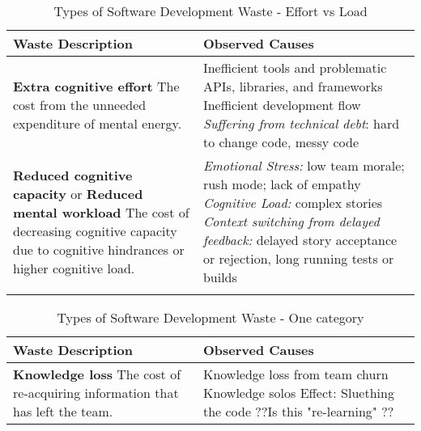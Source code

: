 \begin{table*}[htbp]
\renewcommand{\arraystretch}{1.3}
\centering
\caption{Types of Software Development Waste - Effort vs Load}
\label{Waste}
\begin{tabular}{|p{2.5in}|p{3.6in}|} %
\hline
\textbf{Waste} \newline Description  & Observed Causes 
\\ \hline
\textbf{Extra cognitive effort} \newline   
The cost from the unneeded expenditure of mental energy. & 
Inefficient tools and problematic APIs, libraries, and frameworks  \newline Inefficient development flow \newline
\textit{Suffering from technical debt}: hard to change code, messy code
\\ \hline
\textbf{Reduced cognitive capacity} or \newline 
\textbf{Reduced mental workload} \newline 
The cost of decreasing cognitive capacity due to cognitive hindrances or higher cognitive load.  & 
\textit{Emotional Stress:} low team morale; rush mode; lack of empathy \newline \textit{Cognitive Load:} complex stories \newline
\textit{Context switching from delayed feedback:} delayed story acceptance or rejection, long running tests or builds  \\ \hline
 \\ \hline
\end{tabular} 
\end{table*}



\begin{table*}[htbp]
\renewcommand{\arraystretch}{1.3}
\centering
\caption{Types of Software Development Waste - One category}
\label{Waste}
\begin{tabular}{|p{2.5in}|p{3.6in}|} %
\hline
\textbf{Waste} \newline Description  & Observed Causes 
\\ \hline
\textbf{Knowledge loss} \newline   
The cost of re-acquiring information that has left the team. & 
Knowledge loss from team churn \newline
Knowledge solos \newline
Effect: Sluething the code \newline
??Is this "re-learning" ??
\\ \hline
\end{tabular} 
\end{table*}


